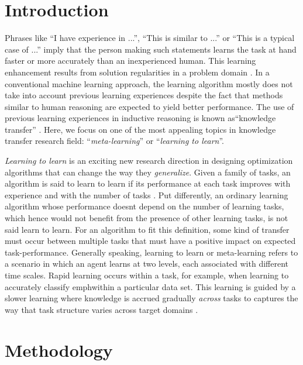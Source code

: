 \documentclass[a4paper, 11pt]{article}
\begin{document}
\section{Introduction}
Phrases like \enquote{I have experience in ...}, \enquote{This is similar to ...} or \enquote{This is a typical case of ...} imply that the person making such statements learns the task at hand faster or more accurately than an inexperienced human. This learning enhancement results from solution regularities in a problem domain \cite{hochreiter2001learning}. In a conventional machine learning approach, the learning algorithm mostly does not take into account previous learning experiences despite the fact that methods similar to human reasoning are expected to yield better performance. The use of previous learning experiences in inductive reasoning is known as\enquote{knowledge transfer} \cite{caruana1995learning, ellis1965transfer}. Here, we focus on one of the most appealing topics in knowledge transfer research field: \enquote{\textit{meta-learning}} or \enquote{\textit{learning to learn}}.

\emph{Learning to learn} is an exciting new research direction in designing optimization algorithms that can change the way they \emph{generalize}. Given a family of tasks, an algorithm is said to learn to learn if its performance at each task improves with experience and with the number of tasks \cite{thrun2012learning}. Put differently, an ordinary learning algorithm whose performance doesn\textsc{}t depend on the number of learning tasks, which hence would not benefit from the presence of other learning tasks, is not said learn to learn. For an algorithm to fit this definition, some kind of transfer must occur between multiple tasks that must have a positive impact on expected task-performance. Generally speaking, learning to learn or meta-learning refers to a scenario in which an agent learns at two levels, each associated with different time scales. Rapid learning occurs within a task, for example, when learning to accurately classify emph{within} a particular data set. This learning is guided by a slower learning where knowledge is accrued gradually \emph{across} tasks to captures the way that task structure varies across target domains \cite{santoro2016meta}.

\vspace{1.5cm}
\section{Methodology}
\end{document}
